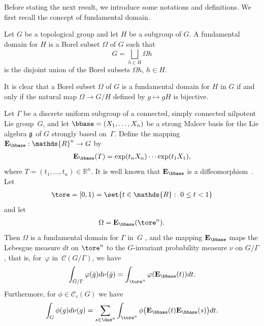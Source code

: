  Before stating the next result, we introduce some notations and
def\/initions. We f\/irst recall the concept of fundamental domain.

\begin{definition} Let $G$ be a topological group and let $H$ be a
subgroup of $G$. A fundamental domain for $H$ is a Borel subset
$\Omega$ of $G$ such that
\[
G= \bigsqcup_{h\in H} \Omega h
\] is
the disjoint union of the Borel subsets $ \Omega h$, $h\in H $.
\end{definition}


\begin{remark}
It is clear that a Borel subset  $\Omega$ of $G$ is a
fundamental domain for $H$ in $G$ if and only if  the natural map
$\Omega \rightarrow G/H$ def\/ined by $g\mapsto gH$ is
bijective.
\end{remark}

Let $\Gamma$ be a discrete uniform subgroup of a connected, simply
connected nilpotent Lie group~$G$, and let $ \bbase =(X_1, \ldots,
X_n)$ be a strong Malcev basis for the Lie algebra $\frak g$ of $G$
strongly based on~$\Gamma$. Def\/ine the mapping $\mathbf{E}_{\bbase}:
\mathds{R}^n\rightarrow G$ by
\begin{gather*}
\mathbf{E}_{\bbase}(T) = \exp(t_n X_n)\cdots \exp(t_1 X_1),
\end{gather*}
where $T= (t_1, \ldots, t_n)\in \mathds{R}^n$. It is well known that
 $\mathbf{E}_{\bbase}$ is a dif\/feomorphism~\cite{Cor1}. Let
\begin{gather*}%
\tore = [0, 1) = \set{t\in \mathds{R}:\ 0\leq t < 1}
\end{gather*}
and let
\begin{gather*}%
\Omega= \mathbf{E}_{\bbase}(\tore^n).
\end{gather*}
Then $\Omega$ is a fundamental domain for $\Gamma$  in~$G$
\cite[Lemma~3.6]{Cor9}, and the mapping $\mathbf{E}_{\bbase}$ maps
the Lebesgue measure $dt$ on $\tore^n$ to the $G$-invariant
probability measure $\nu$ on $G/\Gamma$, that is, for~$\varphi $ in~$ \mathcal{C}(G/\Gamma)$, we have
\begin{gather*}%
\int_{G/\Gamma} \varphi( \dot{g}) d\nu( \dot{g}) = \int_{\tore^n}
\varphi( \mathbf{E}_{\bbase}(t)) dt.
\end{gather*}
Furthermore, for $\phi\in \mathcal{C}_c(G)$ we have
\begin{gather}\label{measure-fundamental-domain1}
\int_{G} \phi(g) d\nu(g) =  \sum_{s\in \dsz^n}\int_{\tore^n}
\phi\big( \mathbf{E}_{\bbase}(t) \mathbf{E}_{\bbase}(s)\big) dt.
\end{gather}


